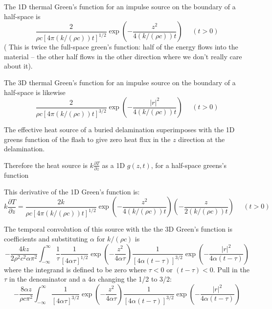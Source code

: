 \documentclass[letterpaper]{article}
\begin{document}
The 1D thermal Green's function for an impulse source on the boundary of a half-space is 
\begin{equation}
\frac{2}{\rho c \left[4\pi (k/(\rho c))t\right]^{1/2}}\exp\left(-\frac{z^{2}}{4 (k/(\rho c)) t}\right)   \ \ \ \ \ \ (t > 0)
\end{equation}
( This is twice the full-space green's function: half of the energy flows into the material -- the other half flows in the other direction where we don't really care about it).

The 3D thermal Green's function for an impulse source on the boundary of a half-space is likewise 
\begin{equation}
\frac{2}{\rho c \left[4\pi (k/(\rho c))t\right]^{3/2}}\exp\left(-\frac{|r|^{2}}{4 (k/(\rho c)) t}\right)  \ \ \ \ \ \ (t > 0)
\end{equation}

The effective heat source of a buried delamination superimposes with the 1D greens function of the flash to give zero heat flux in the $z$ direction at the delamination.

Therefore the heat source is $k \frac{\partial T}{\partial z}$ as a 1D $g(z,t)$, for a half-space greens's function 

This derivative of the 1D Green's function is:
\begin{equation}
k\frac{\partial T}{\partial z}=\frac{2k}{\rho c \left[4\pi (k/(\rho c))t\right]^{1/2}}\exp\left(-\frac{z^{2}}{4 (k/(\rho c)) t}\right)\left(-\frac{z}{2(k/(\rho c))t}\right)  \ \ \ \ \ \ (t > 0)
\end{equation}


The temporal convolution of this source with the the 3D Green's function is
coefficients and substituting $\alpha$ for $k/(\rho c)$ is
\begin{equation}
-\frac{4kz}{2\rho^{2} c^{2}\alpha\pi^{2}} \int_{-\infty}^{\infty}\frac{1}{\tau}\frac{1}{\left[4\alpha\tau\right]^{1/2}}\exp\left(-\frac{z^{2}}{4\alpha\tau}\right)\frac{1}{\left[4\alpha(t-\tau)\right]^{3/2}}\exp\left(-\frac{|r|^{2}}{4\alpha(t-\tau)}\right)
\end{equation}
where the integrand is defined to be zero where $\tau < 0$ or $(t-\tau) < 0$.
Pull in the $\tau$ in the denominator and a $4\alpha$ changing the 1/2 to 3/2:
\begin{equation}
-\frac{8\alpha z}{\rho c\pi^{2}} \int_{-\infty}^{\infty}\frac{1}{\left[4\alpha\tau\right]^{3/2}}\exp\left(-\frac{z^{2}}{4\alpha\tau}\right)\frac{1}{\left[4\alpha(t-\tau)\right]^{3/2}}\exp\left(-\frac{|r|^{2}}{4\alpha(t-\tau)}\right)
\end{equation}
\end{document}
